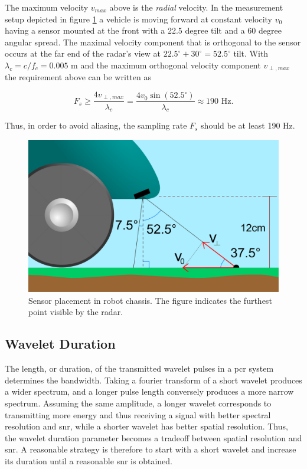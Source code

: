 The maximum velocity $v_{max}$ above is the \emph{radial} velocity. In the measurement setup depicted in figure \ref{fig:sensor_placement} a vehicle is moving forward at constant velocity $v_0$ having a sensor mounted at the front with a 22.5 degree tilt and a 60 degree angular spread. The maximal velocity component that is orthogonal to the sensor occurs at the far end of the radar's view at $22.5^\circ + 30^\circ = 52.5^\circ$ tilt. With $\lambda_c=c/f_c=0.005$ m and the maximum orthogonal velocity component $v_{\perp, max}$ the requirement above can be written as

\begin{equation}
	F_s \geq 
	\frac{4v_{\perp, max}}{\lambda_c}
	= \frac{4v_0\sin(52.5^\circ)}{\lambda_c} 
	\approx 190 \text{ Hz}.
\end{equation}

Thus, in order to avoid aliasing, the sampling rate $F_s$ should be at least 190 Hz. 


\begin{figure}[h]
	\centering
	\includegraphics[scale=0.30]{figs_temp/sensor_placement.jpg}
	\caption{Sensor placement in robot chassis. The figure indicates the furthest point visible by the radar.}
	\label{fig:sensor_placement}
\end{figure}
\subsection{Wavelet Duration}

The length, or duration, of the transmitted wavelet pulses in a \gls{pcr} system determines the bandwidth. Taking a fourier transform of a short wavelet produces a wider spectrum, and a longer pulse length conversely produces a more narrow spectrum. Assuming the same amplitude, a longer wavelet corresponds to transmitting more energy and thus receiving a signal with better spectral resolution and \gls{snr}, while a shorter wavelet has better spatial resolution. Thus, the wavelet duration parameter becomes a tradeoff between spatial resolution and \gls{snr}. A reasonable strategy is therefore to start with a short wavelet and increase its duration until a reasonable \gls{snr} is obtained.  

